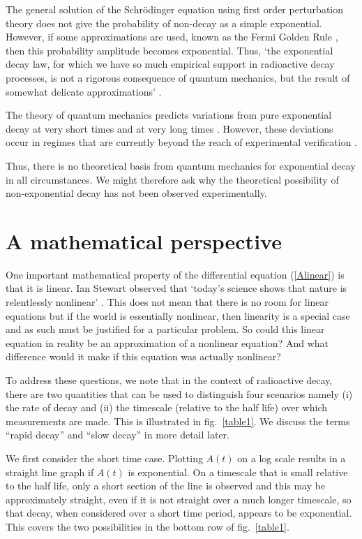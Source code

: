\documentclass[12pt]{article}
\newcommand{\Ref}[1]{(\ref{#1})}
\begin{document}
The general solution of the Schr\"odinger equation using first order
perturbation theory does not give the probability of non-decay as
a simple exponential. However, if some
approximations are used, known as the Fermi Golden Rule 
\cite{fonda78,merzbacher98}, then this probability amplitude becomes
exponential. Thus, `the exponential
decay law, for which we have so much empirical support in radioactive decay
processes, is not a rigorous consequence of quantum mechanics, but the
result of somewhat delicate approximations' \cite[p513]{merzbacher98}.

The theory of quantum mechanics predicts variations from pure exponential 
decay at very short times and at very long times \cite{peres80}. However,
these deviations occur in regimes that are currently beyond the reach of
experimental verification \cite{norman88}.

Thus, there is no
theoretical basis from quantum mechanics for exponential decay in
all circumstances. We might therefore ask why the theoretical possibility
of non-exponential decay has not been observed experimentally.


\section{A mathematical perspective}
\label{maths}

One important mathematical property of the differential equation 
\Ref{Alinear} is that it is linear. Ian Stewart observed that `today's 
science shows that nature is relentlessly nonlinear' \cite[p83]{stewart02}. 
This does not mean that there is no room for linear equations
but if the world is essentially nonlinear, then linearity is 
a special case and as such must be justified for a particular problem. 
So could this linear equation in reality be an approximation of
a nonlinear equation? And what difference would it make if this equation
was actually nonlinear?

To address these questions, we note that in the context of radioactive decay, 
there are two quantities that can be used to distinguish four scenarios
namely (i) the rate of decay and (ii) the timescale (relative
to the half life) over which measurements are made. This is illustrated in 
fig.~\ref{table1}. We discuss the terms ``rapid decay'' and 
``slow decay'' in more detail later.

We first consider the short time case. Plotting $A(t)$ on 
a log scale results in a straight line graph if $A(t)$ is exponential.
On a timescale that is small relative to the half life, only a short section 
of the line is observed and this may be approximately straight, 
even if it is not straight over a much longer timescale, so that decay,
when considered over a short time period, appears to be exponential. This 
covers the two possibilities in the bottom row of fig.~\ref{table1}.
\end{document}
